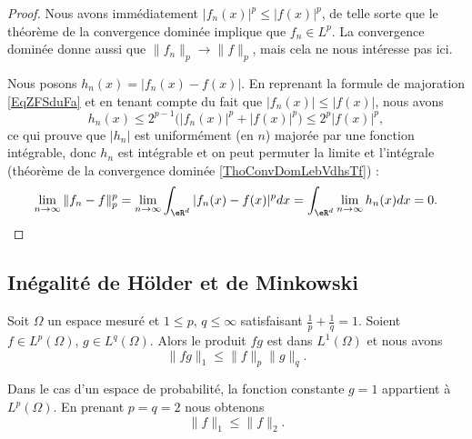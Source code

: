 \begin{proof}
    Nous avons immédiatement \( | f_n(x) |^p\leq | f(x) |^p\), de telle sorte que le théorème de la convergence dominée implique que \( f_n\in L^p\). La convergence dominée donne aussi que \( \| f_n \|_p\to\| f \|_p\), mais cela ne nous intéresse pas ici.

    Nous posons \( h_n(x)= | f_n(x)-f(x) | \). En reprenant la formule de majoration \eqref{EqZFSduFa} et en tenant compte du fait que \( | f_n(x) |\leq | f(x) |\), nous avons
   \begin{equation}
       h_n(x)\leq 2^{p-1}\big( | f_n(x) |^p+| f(x) |^p \big)\leq 2^p| f(x) |^p,
   \end{equation}
   ce qui prouve que \( | h_n |\) est uniformément (en \( n\)) majorée par une fonction intégrable, donc \( h_n\) est intégrable et on peut permuter la limite et l'intégrale (théorème de la convergence dominée \ref{ThoConvDomLebVdhsTf}) :
   \begin{equation}
       \lim_{n\to \infty} \| f_n-f \|^p_p=\lim_{n\to \infty} \int_{\eR^d}| f_n(x)-f(x) |^pdx=\int_{\eR^d}\lim_{n\to \infty} h_n(x)dx=0.
   \end{equation}
\end{proof}

\subsection{Inégalité de Hölder et de Minkowski}

\begin{proposition}       \label{ProptYqspT}
    Soit \( \Omega\) un espace mesuré et \( 1\leq p\), \( q\leq\infty\) satisfaisant \( \frac{1}{ p }+\frac{1}{ q }=1\). Soient \( f\in L^p(\Omega)\), \( g\in L^q(\Omega)\). Alors le produit \( fg\) est dans \( L^1(\Omega)\) et nous avons
    \begin{equation}
        \| fg \|_1\leq \| f \|_p\| g \|_q.
    \end{equation}
\end{proposition}

\begin{remark}      \label{RemNormuptNird}
    Dans le cas d'un espace de probabilité, la fonction constante \( g=1\) appartient à \( L^p(\Omega)\). En prenant \( p=q=2\) nous obtenons
    \begin{equation}
        \| f \|_1\leq\| f \|_2.
    \end{equation}
\end{remark}

